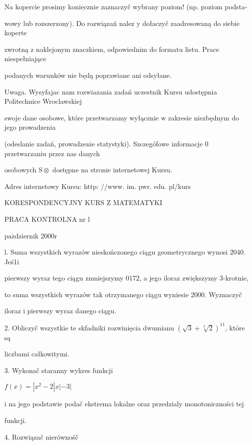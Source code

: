 \documentclass[a4paper,12pt]{article}
\begin{document}
Na kopercie prosimy $\underline{\mathrm{k}\mathrm{o}\mathrm{n}\mathrm{i}\mathrm{e}\mathrm{c}\mathrm{z}\mathrm{n}\mathrm{i}\mathrm{e}}$ zaznaczyč wybrany poziom! (np. poziom podsta-

wowy lub rozszerzony). Do rozwiązań nalez $\mathrm{y}$ dołaczyč zaadresowaną do siebie koperte

zwrotną $\mathrm{z}$ naklejonym znaczkiem, odpowiednim do formatu listu. Prace niespełniające

podanych warunków nie będą poprawiane ani odsyłane.

Uwaga. Wysyfajac nam rozwiazania zadań uczestnik Kursu udostępnia Politechnice Wroclawskiej

swoje dane osobowe, które przetwarzamy wyłącznie $\mathrm{w}$ zakresie niezbędnym do jego prowadzenia

(odeslanie zadań, prowadzenie statystyki). Szczegófowe informacje $0$ przetwarzaniu przez nas danych

osobowych $\mathrm{S}\otimes$ dostępne na stronie internetowej Kursu.

Adres internetowy Kursu: http: //www. im. pwr. edu. pl/kurs







KORESPONDENCYJNY KURS Z MATEMATYKI

PRACA KONTROLNA nr l

$\mathrm{p}\mathrm{a}\acute{\mathrm{z}}$dziernik 2$000\mathrm{r}$

l. Suma wszystkich wyrazów nieskończonego ciągu geometrycznego wynosi 2040. Jeś1i

pierwszy wyraz tego ciągu zmniejszymy $0172$, a jego iloraz zwiększymy 3-krotnie,

to suma wszystkich wyrazów tak otrzymanego ciągu wyniesie 2000. Wyznaczyč

iloraz $\mathrm{i}$ pierwszy wyraz danego ciągu.

2. Obliczyč wszystkie te skfadniki rozwinięcia dwumianu $(\sqrt{3}+\sqrt[3]{2})^{11}$, które są

liczbami całkowitymi.

3. Wykonač staranny wykres funkcji

$f(x)=|x^{2}-2|x|-3|$

i na jego podstawie podač ekstrema lokalne oraz przedzialy monotoniczności tej

funkcji.

4. Rozwiązač nierównośč
\end{document}
